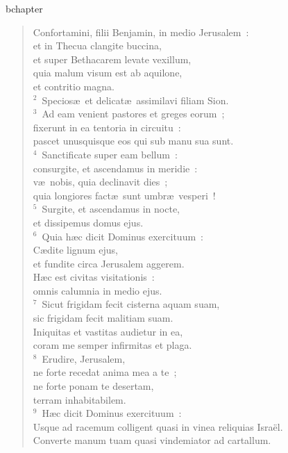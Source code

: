 bchapter\begin{flushleft}\begin{verse}\vspace{-19pt}Confortamini, filii Benjamin, in medio Jerusalem~:\\ et in Thecua clangite buccina,\\ et super Bethacarem levate vexillum,\\ quia malum visum est ab aquilone,\\ et contritio magna.\\
${}^{2}$~Specios\ae\ et delicat\ae\ assimilavi filiam Sion.\\
${}^{3}$~Ad eam venient pastores et greges eorum~;\\ fixerunt in ea tentoria in circuitu~:\\ pascet unusquisque eos qui sub manu sua sunt.\\
${}^{4}$~Sanctificate super eam bellum~:\\ consurgite, et ascendamus in meridie~:\\ v\ae\ nobis, quia declinavit dies~;\\ quia longiores fact\ae\ sunt umbr\ae\ vesperi~!\\
${}^{5}$~Surgite, et ascendamus in nocte,\\ et dissipemus domus ejus.\\
${}^{6}$~Quia h\ae c dicit Dominus exercituum~:\\ C\ae dite lignum ejus,\\ et fundite circa Jerusalem aggerem.\\ H\ae c est civitas visitationis~:\\ omnis calumnia in medio ejus.\\
${}^{7}$~Sicut frigidam fecit cisterna aquam suam,\\ sic frigidam fecit malitiam suam.\\ Iniquitas et vastitas audietur in ea,\\ coram me semper infirmitas et plaga.\\
${}^{8}$~Erudire, Jerusalem,\\ ne forte recedat anima mea a te~;\\ ne forte ponam te desertam,\\ terram inhabitabilem.\\
${}^{9}$~H\ae c dicit Dominus exercituum~:\\ Usque ad racemum colligent quasi in vinea reliquias Isra\"el.\\ Converte manum tuam quasi vindemiator ad cartallum.\\

\end{verse}
\end{flushleft}
